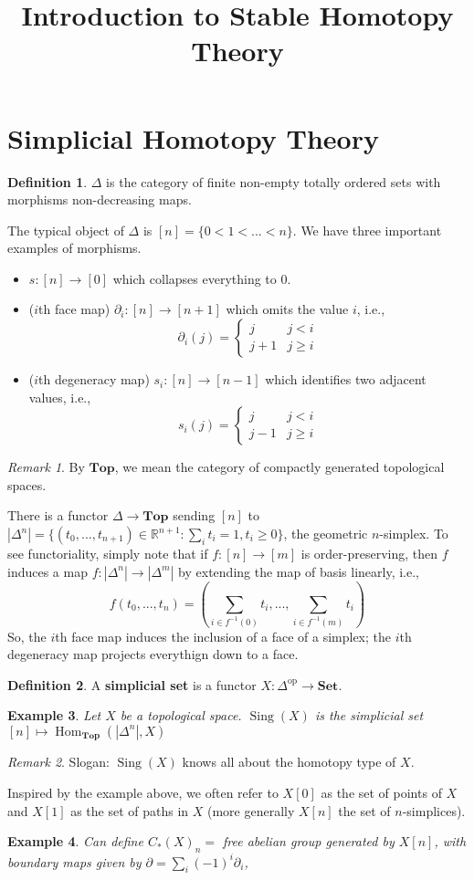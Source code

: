 \documentclass{article}
\title{Introduction to Stable Homotopy Theory}
\author{}
\date{}
\theoremstyle{definition}
\newtheorem{defn}{Definition}[section]
\theoremstyle{remark}
\newtheorem{rem}{Remark}
\theoremstyle{plain}
\newtheorem{example}[defn]{Example}
\newcommand{\RR}{\mathbb{R}}
\begin{document}
\maketitle
\section{Simplicial Homotopy Theory}
\begin{defn}
    $\Delta$ is the category of finite non-empty totally ordered sets with morphisms non-decreasing maps.
\end{defn}
The typical object of $\Delta$ is $[n]=\{0<1<...<n\}$. We have three important examples of morphisms.
\begin{itemize}
    \item $s:[n]\to[0]$ which collapses everything to $0$.
    \item ($i$th face map) $\partial_i:[n]\to[n+1]$ which omits the value $i$, i.e.,
    \[\partial_i(j)=\begin{cases}
        j & j< i\\
        j+1 & j\ge i
    \end{cases}\]
    \item ($i$th degeneracy map) $s_i:[n]\to[n-1]$ which identifies two adjacent values, i.e.,
    \[s_i(j)=\begin{cases}
        j & j<i\\
        j-1 & j\ge i
    \end{cases}\]
\end{itemize}
\begin{rem}
    By $\mathbf{Top}$, we mean the category of compactly generated topological spaces.
\end{rem}
There is a functor $\Delta\to\mathbf{Top}$ sending $[n]$ to $|\Delta^n|=\{(t_0,...,t_{n+1})\in\RR^{n+1}\colon \sum_it_i=1, t_i\ge 0\}$, the geometric $n$-simplex. To see functoriality, simply note that if $f:[n]\to[m]$ is order-preserving, then
$f$ induces a map $f:|\Delta^n|\to|\Delta^m|$ by extending the map of basis linearly, i.e.,
\[f(t_0,...,t_n)=\left(\sum_{i\in f^{-1}(0)}t_i,...,\sum_{i\in f^{-1}(m)}t_i\right)\]
So, the $i$th face map induces the inclusion of a face of a simplex; the $i$th degeneracy map projects everythign down to a face.
\begin{defn}
    A \textbf{simplicial set} is a functor $X:\Delta^{\text{op}}\to\mathbf{Set}$.
\end{defn}
\begin{example}
    Let $X$ be a topological space. $\operatorname{Sing}(X)$ is the simplicial set $[n]\mapsto \operatorname{Hom}_{\mathbf{Top}}(|\Delta^n|,X)$
\end{example}
\begin{rem}
    Slogan: $\operatorname{Sing}(X)$ knows all about the homotopy type of $X$.
\end{rem}
Inspired by the example above, we often refer to $X[0]$ as the set of points of $X$ and $X[1]$ as the set of paths in $X$ (more generally $X[n]$ the set of $n$-simplices).
\begin{example}
    Can define $C_\ast(X)_n=$ free abelian group generated by $X[n]$, with boundary maps given by $\partial=\sum_i(-1)^i\partial_i$,
\end{example}
\end{document}

